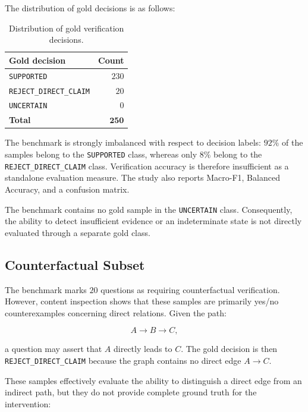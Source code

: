 The distribution of gold decisions is as follows:

\begin{table}[t]
    \centering
    \caption{Distribution of gold verification decisions.}
    \label{tab:gold-decision}
    \begin{tabular}{lr}
        \hline
        \textbf{Gold decision} & \textbf{Count} \\
        \hline
        \texttt{SUPPORTED} & \(230\) \\
        \texttt{REJECT\_DIRECT\_CLAIM} & \(20\) \\
        \texttt{UNCERTAIN} & \(0\) \\
        \hline
        \textbf{Total} & \(\mathbf{250}\) \\
        \hline
    \end{tabular}
\end{table}

The benchmark is strongly imbalanced with respect to decision labels: \(92\%\)
of the samples belong to the \texttt{SUPPORTED} class, whereas only \(8\%\)
belong to the \texttt{REJECT\_DIRECT\_CLAIM} class. Verification accuracy is
therefore insufficient as a standalone evaluation measure. The study also
reports Macro-F1, Balanced Accuracy, and a confusion matrix.

The benchmark contains no gold sample in the \texttt{UNCERTAIN} class.
Consequently, the ability to detect insufficient evidence or an indeterminate
state is not directly evaluated through a separate gold class.

\subsection{Counterfactual Subset}

The benchmark marks \(20\) questions as requiring counterfactual verification.
However, content inspection shows that these samples are primarily yes/no
counterexamples concerning direct relations. Given the path:

\[
A \rightarrow B \rightarrow C,
\]

a question may assert that \(A\) directly leads to \(C\). The gold decision is
then \texttt{REJECT\_DIRECT\_CLAIM} because the graph contains no direct edge
\(A \rightarrow C\).

These samples effectively evaluate the ability to distinguish a direct edge
from an indirect path, but they do not provide complete ground truth for the
intervention:

